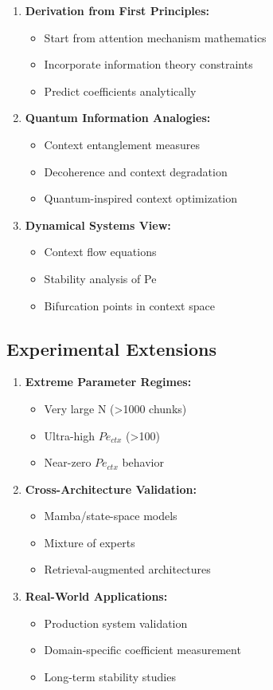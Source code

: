 \documentclass[conference]{IEEEtran}
\begin{document}
\begin{enumerate}
\item \textbf{Derivation from First Principles:}
   \begin{itemize}
   \item Start from attention mechanism mathematics
   \item Incorporate information theory constraints
   \item Predict coefficients analytically
   \end{itemize}

\item \textbf{Quantum Information Analogies:}
   \begin{itemize}
   \item Context entanglement measures
   \item Decoherence and context degradation
   \item Quantum-inspired context optimization
   \end{itemize}

\item \textbf{Dynamical Systems View:}
   \begin{itemize}
   \item Context flow equations
   \item Stability analysis of Pe
   \item Bifurcation points in context space
   \end{itemize}
\end{enumerate}

\subsection{Experimental Extensions}

\begin{enumerate}
\item \textbf{Extreme Parameter Regimes:}
   \begin{itemize}
   \item Very large N (>1000 chunks)
   \item Ultra-high $Pe_{ctx}$ (>100)
   \item Near-zero $Pe_{ctx}$ behavior
   \end{itemize}

\item \textbf{Cross-Architecture Validation:}
   \begin{itemize}
   \item Mamba/state-space models
   \item Mixture of experts
   \item Retrieval-augmented architectures
   \end{itemize}

\item \textbf{Real-World Applications:}
   \begin{itemize}
   \item Production system validation
   \item Domain-specific coefficient measurement
   \item Long-term stability studies
   \end{itemize}
\end{enumerate}
\end{document}
